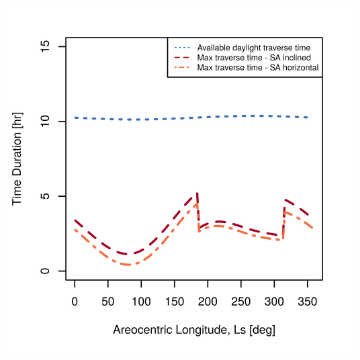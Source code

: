 \begin{figure}[h]
\captionsetup[subfigure]{justification=centering}
\vspace{-2ex}
	\centering
    \setlength{\subfigureWidth}{0.50\textwidth}
    \setlength{\graphicsHeight}{80mm}
    \hypersetup{hidelinks=true}%
    \begin{subfigure}[t]{\subfigureWidth}
        \centering
        \includegraphics[height=\graphicsHeight]{sections/design/solar-array/plots/ianichaos-75w-max-traverse-durations-for-sa-area-17m2.png}
		\label{fig:plot:sub:final-maximum-traverse-durations-iani-chaos}
    \end{subfigure}\hfill
    \begin{subfigure}[t]{\subfigureWidth}
        \centering

\end{subfigure}
\end{figure}
